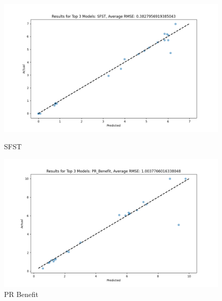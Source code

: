 \begin{figure}[H]
    \centering
    \begin{minipage}{0.495\textwidth}
        \centering
        \includegraphics[width=\linewidth]{reg_section_specxtra/images_reg_ensemble/ensemble_learning_rmse_plot_top_3_Models_SFST.png}
        \caption{SFST}
        \label{fig:sfst_ensemble}
    \end{minipage}\hfill
    \begin{minipage}{0.495\textwidth}
        \centering
        \includegraphics[width=\linewidth]{reg_section_specxtra/images_reg_ensemble/ensemble_learning_rmse_plot_top_3_Models_PR_Benefit.png}
        \caption{PR Benefit}
        \label{fig:pr_ben_ensemble}
    \end{minipage}
\end{figure}


